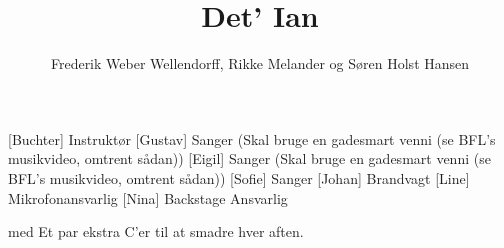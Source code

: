 \documentclass[a4paper,11pt]{article}
\title{Det' Ian}
\author{Frederik Weber Wellendorff, Rikke Melander og Søren Holst Hansen}
\begin{document}
\maketitle

\begin{roles}
[Buchter] Instruktør
[Gustav] Sanger (Skal bruge en gadesmart venni (se BFL’s musikvideo, omtrent sådan))
[Eigil] Sanger (Skal bruge en gadesmart venni (se BFL’s musikvideo, omtrent sådan))
[Sofie] Sanger
[Johan] Brandvagt
[Line] Mikrofonansvarlig
[Nina] Backstage Ansvarlig
\end{roles}

\begin{props}
 med Et par ekstra C'er til at smadre hver aften.
\end{props}
\end{document}

